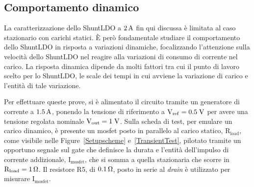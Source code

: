 \subsection{Comportamento dinamico}

La caratterizzazione dello ShuntLDO a $2 \rm \, A$ fin qui discussa \`e limitata al caso stazionario con carichi statici.
\`E per\`o fondamentale studiare il comportamento dello ShuntLDO in risposta a variazioni dinamiche, focalizzando l'attenzione sulla velocità dello ShuntLDO nel reagire alla variazioni di consumo di corrente nel carico. 
La risposta dinamica dipende da molti fattori tra cui il punto di lavoro scelto per lo ShuntLDO, le scale dei tempi in cui avviene la variazione di carico e l'entità di tale variazione.

Per effettuare queste prove, si è alimentato il circuito tramite un generatore di corrente a $1.5\rm \, A$, ponendo la tensione di riferimento a $\mathrm{V_{ref}=0.5 \rm \; V}$ per avere una tensione regolata nominale $\mathrm{V_{out}}=1\rm \; V$. %
Sulla scheda di test, per emulare un carico dinamico, è presente un mosfet posto in parallelo al carico statico, $\mathrm{R_{load}}$, come visibile nelle Figure~\ref{Setupscheme} e~\ref{TransientTest}, pilotato tramite un opportuno segnale sul gate che definisce la durata e l'entit\`a dell'impulso di corrente addizionale, $\mathrm{I_{mosfet}}$, che si somma a quella stazionaria che scorre in $\mathrm{R_{load}= 1 {\rm \, \Omega}}$. Il resistore R5, di $0.1 {\rm \, \Omega}$, posto in serie al \textit{drain} \`e utilizzato per misurare $\mathrm{I_{mosfet}}$.

